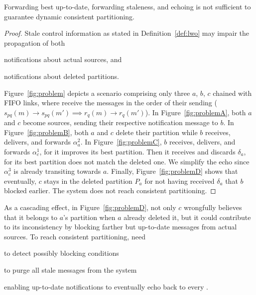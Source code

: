 \begin{lemma} Forwarding best up-to-date,
  forwarding staleness, and echoing is not sufficient to guarantee
  dynamic consistent partitioning.
\end{lemma}

\begin{proof}
Stale control information as stated in Definition~\ref{def:lwo} may
impair the propagation of both
\begin{inparaenum}[(i)]
\item notifications about actual sources, and
\item notifications about deleted partitions.
\end{inparaenum}
Figure~\ref{fig:problem} depicts a scenario comprising only three
\processes $a$, $b$, $c$ chained with FIFO links, \ie where \processes
receive the messages in the order of their sending ($s_{pq}(m)
\rightarrow s_{pq}(m') \implies r_q(m) \rightarrow r_q(m')$). In
Figure~\ref{fig:problemA}, both $a$ and $c$ become sources, sending
their respective notification message to $b$. In
Figure~\ref{fig:problemB}, both $a$ and $c$ delete their partition
while $b$ receives, delivers, and forwards $\alpha_a^2$. In
Figure~\ref{fig:problemC}, $b$ receives, delivers, and forwards
$\alpha_c^1$, for it improves its best partition. Then it receives and
discards $\delta_a$, for its best partition does not match the deleted
one. We simplify the echo since $\alpha_c^3$ is already transiting
towards $a$. Finally, Figure~\ref{fig:problemD} shows that eventually,
$c$ stays in the deleted partition $P_a$ for not having received
$\delta_a$ that $b$ blocked earlier. The system does not reach
consistent partitioning. \end{proof}

As a cascading effect, in Figure~\ref{fig:problemD}, not only $c$
wrongfully believes that it belongs to $a$'s partition when $a$
already deleted it, but it could contribute to its inconsistency by
blocking farther but up-to-date messages from actual sources. To reach
consistent partitioning, \processes need
\begin{inparaenum}[(i)]
\item to detect possibly blocking conditions 
\item to purge all stale messages from the system
\item enabling up-to-date notifications to eventually echo back to
  every \process.
\end{inparaenum}

